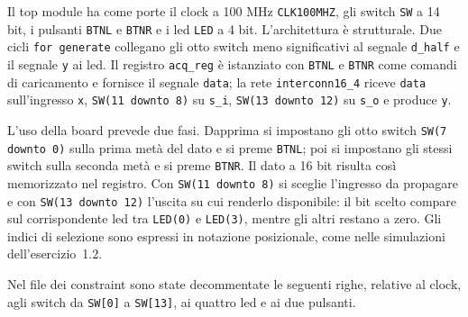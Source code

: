 
Il top module ha come porte il clock a 100 MHz \texttt{CLK100MHZ}, gli switch \texttt{SW} a 14 bit, i pulsanti \texttt{BTNL} e \texttt{BTNR} e i led \texttt{LED} a 4 bit. L'architettura è strutturale. Due cicli \texttt{for generate} collegano gli otto switch meno significativi al segnale \texttt{d\_half} e il segnale \texttt{y} ai led. Il registro \texttt{acq\_reg} è istanziato con \texttt{BTNL} e \texttt{BTNR} come comandi di caricamento e fornisce il segnale \texttt{data}; la rete \texttt{interconn16\_4} riceve \texttt{data} sull'ingresso \texttt{x}, \texttt{SW(11 downto 8)} su \texttt{s\_i}, \texttt{SW(13 downto 12)} su \texttt{s\_o} e produce \texttt{y}.


\sintesiboard

L'uso della board prevede due fasi. Dapprima si impostano gli otto switch \texttt{SW(7 downto 0)} sulla prima metà del dato e si preme \texttt{BTNL}; poi si impostano gli stessi switch sulla seconda metà e si preme \texttt{BTNR}. Il dato a 16 bit risulta così memorizzato nel registro. Con \texttt{SW(11 downto 8)} si sceglie l'ingresso da propagare e con \texttt{SW(13 downto 12)} l'uscita su cui renderlo disponibile: il bit scelto compare sul corrispondente led tra \texttt{LED(0)} e \texttt{LED(3)}, mentre gli altri restano a zero. Gli indici di selezione sono espressi in notazione posizionale, come nelle simulazioni dell'esercizio~1.2.

Nel file dei constraint sono state decommentate le seguenti righe, relative al clock, agli switch da \texttt{SW[0]} a \texttt{SW[13]}, ai quattro led e ai due pulsanti.

